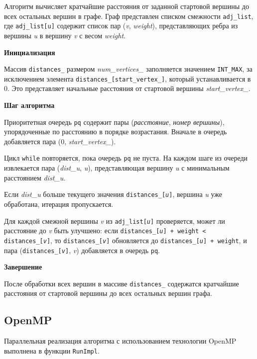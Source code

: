 \documentclass[12pt]{article}
\begin{document}
\hspace*{1.25em}Алгоритм вычисляет кратчайшие расстояния от заданной стартовой вершины до всех остальных вершин в графе. Граф представлен списком смежности \texttt{adj\_list}, где \texttt{adj\_list[u]} содержит список пар (\textit{v}, \textit{weight}), представляющих ребра из вершины \textit{u} в вершину \textit{v} с весом \textit{weight}.

\textbf{Инициализация}

Массив \texttt{distances\_} размером \textit{num\_vertices\_} заполняется значением \texttt{INT\_MAX}, за исключением элемента \texttt{distances\_[start\_vertex\_]}, который устанавливается в 0. Это представляет начальные расстояния от стартовой вершины \textit{start\_vertex\_}.

\textbf{Шаг алгоритма}

Приоритетная очередь \texttt{pq} содержит пары (\textit{расстояние}, \textit{номер вершины}), упорядоченные по расстоянию в порядке возрастания. Вначале в очередь добавляется пара (0, \textit{start\_vertex\_}).

Цикл \texttt{while} повторяется, пока очередь \texttt{pq} не пуста. На каждом шаге из очереди извлекается пара (\textit{dist\_u}, \textit{u}), представляющая вершину \textit{u} с минимальным расстоянием \textit{dist\_u}.

Если \textit{dist\_u} больше текущего значения \texttt{distances\_[\textit{u}]}, вершина \textit{u} уже обработана, итерация пропускается.

Для каждой смежной вершины \textit{v} из \texttt{adj\_list[\textit{u}]} проверяется, может ли расстояние до \textit{v} быть улучшено: если \texttt{distances\_[\textit{u}] + weight < distances\_[\textit{v}]}, то \texttt{distances\_[\textit{v}]} обновляется до \texttt{distances\_[\textit{u}] + weight}, и пара (\texttt{distances\_[\textit{v}]}, \textit{v}) добавляется в очередь \texttt{pq}.

\textbf{Завершение}

После обработки всех вершин в массиве \texttt{distances\_} содержатся кратчайшие расстояния от стартовой вершины до всех остальных вершин графа.

\subsection{OpenMP}

\hspace*{1.25em}Параллельная реализация алгоритма с использованием технологии OpenMP выполнена в функции \texttt{RunImpl}. 
\end{document}
